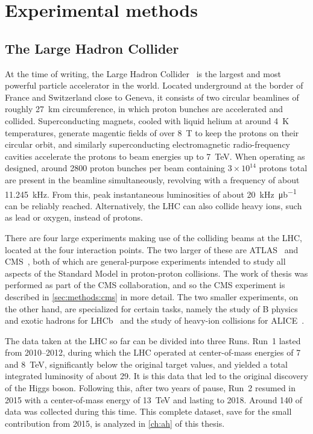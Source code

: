 \chapter{Experimental methods}
\label{ch:methods}

\section{The Large Hadron Collider}

At the time of writing, the Large Hadron Collider~\cite{Bruning:2004ej} is the largest and most powerful particle accelerator in the world. Located underground at the border of France and Switzerland close to Geneva, it consists of two circular beamlines of roughly 27~km circumference, in which proton bunches are accelerated and collided. Superconducting magnets, cooled with liquid helium at around 4~K temperatures, generate magentic fields of over 8~T to keep the protons on their circular orbit, and similarly superconducting electromagnetic radio-frequency cavities accelerate the protons to beam energies up to 7~TeV. When operating as designed, around 2800 proton bunches per beam containing $3\times10^{14}$ protons total are present in the beamline simultaneously, revolving with a frequency of about 11.245~kHz. From this, peak instantaneous luminosities of about \SI{20}{\kilo\hertz\per\micro\barn} can be reliably reached. Alternatively, the LHC can also collide heavy ions, such as lead or oxygen, instead of protons.

There are four large experiments making use of the colliding beams at the LHC, located at the four interaction points. The two larger of these are ATLAS~\cite{ATLAS:2008xda} and CMS~\cite{CMS:2008xjf}, both of which are general-purpose experiments intended to study all aspects of the Standard Model in proton-proton collisions. The work of thesis was performed as part of the CMS collaboration, and so the CMS experiment is described in \cref{sec:methods:cms} in more detail. The two smaller experiments, on the other hand, are specialized for certain tasks, namely the study of B physics and exotic hadrons for LHCb~\cite{LHCb:2008vvz} and the study of heavy-ion collisions for ALICE~\cite{ALICE:2008ngc}.

The data taken at the LHC so far can be divided into three Runs. Run~1 lasted from 2010--2012, during which the LHC operated at center-of-mass energies of 7 and 8~TeV, significantly below the original target values, and yielded a total integrated luminosity of about \SI{29}{\fbinv}. It is this data that led to the original discovery of the Higgs boson. Following this, after two years of pause, Run~2 resumed in 2015 with a center-of-mass energy of 13~TeV and lasting to 2018. Around \SI{140}{\fbinv} of data was collected during this time. This complete dataset, save for the small contribution from 2015, is analyzed in \cref{ch:ah} of this thesis.

